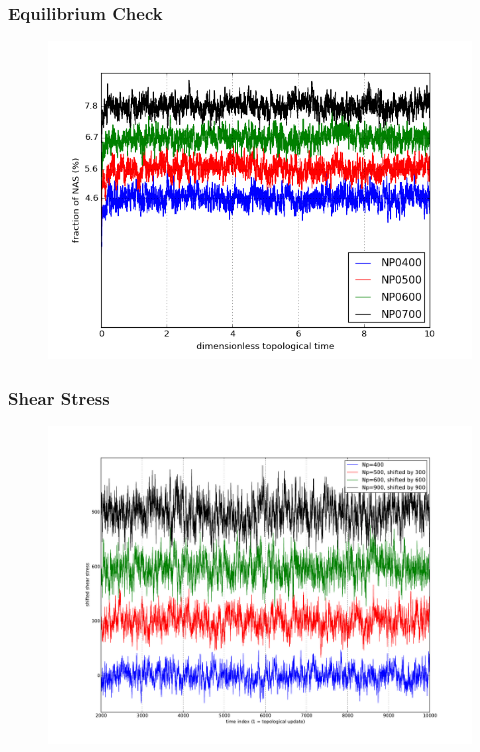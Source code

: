 \documentclass[slidestop, compress, mathserif]{beamer}
\begin{document}
\begin{frame}
  \frametitle<presentation>{Equilibrium Check}
  \begin{figure}
    \centering
    \includegraphics[height=0.8\textheight]{../NAS_check_EQ.png}
  \end{figure}
\end{frame}

\begin{frame}
  \frametitle<presentation>{Shear Stress}
  \begin{figure}
    \centering
    \includegraphics[height=0.8\textheight]{../tmp_shear.pdf}
  \end{figure}
\end{frame}
\end{document}
